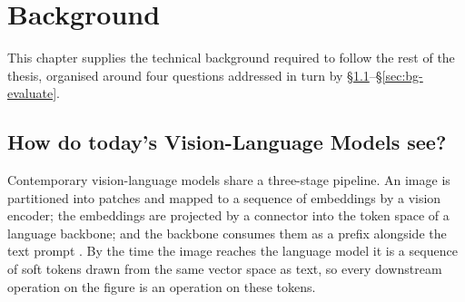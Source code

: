\chapter{Background\label{chap:background}}

This chapter supplies the technical background required to
follow the rest of the thesis, organised around four questions
addressed in turn by
\S\ref{sec:bg-see}--\S\ref{sec:bg-evaluate}.

\section{How do today's Vision-Language Models see?}
\label{sec:bg-see}

Contemporary vision-language models share a three-stage
pipeline. An image is partitioned into patches and mapped to a
sequence of embeddings by a vision encoder; the embeddings are
projected by a connector into the token space of a language
backbone; and the backbone consumes them as a prefix alongside
the text prompt
\citep{liu2023llava, alayrac2022flamingo, li2023blip2}. By the
time the image reaches the language model it is a sequence of
soft tokens drawn from the same vector space as text, so every
downstream operation on the figure is an operation on these
tokens.

